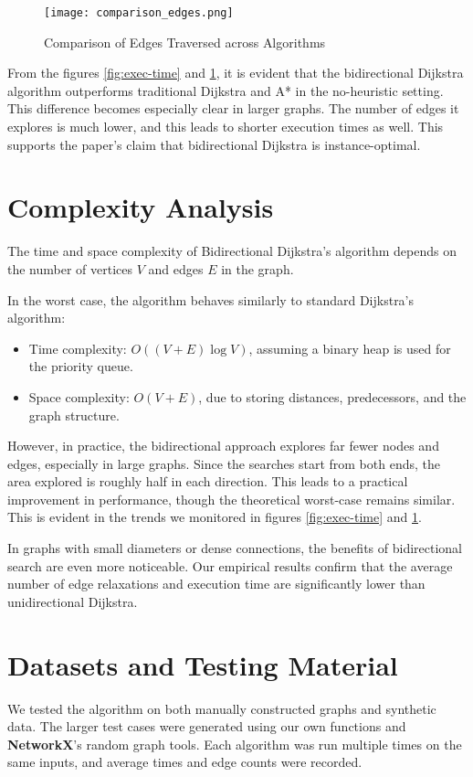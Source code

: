 \documentclass[12pt]{article}
\begin{document}
\begin{figure}[h]
    \centering
    \texttt{[image: comparison\_edges.png]}
    \caption{Comparison of Edges Traversed across Algorithms}
    \label{fig:edges-traversed}
\end{figure}

\break
From the figures \ref{fig:exec-time} and \ref{fig:edges-traversed}, it is evident that the bidirectional Dijkstra algorithm outperforms traditional Dijkstra and A* in the no-heuristic setting. This difference becomes especially clear in larger graphs. The number of edges it explores is much lower, and this leads to shorter execution times as well. This supports the paper’s claim that bidirectional Dijkstra is instance-optimal.

\section{Complexity Analysis}
The time and space complexity of Bidirectional Dijkstra’s algorithm depends on the number of vertices \( V \) and edges \( E \) in the graph.

In the worst case, the algorithm behaves similarly to standard Dijkstra's algorithm:
\begin{itemize}
    \item Time complexity: \( O((V + E) \log V) \), assuming a binary heap is used for the priority queue.
    \item Space complexity: \( O(V + E) \), due to storing distances, predecessors, and the graph structure.
\end{itemize}

However, in practice, the bidirectional approach explores far fewer nodes and edges, especially in large graphs. Since the searches start from both ends, the area explored is roughly half in each direction. This leads to a practical improvement in performance, though the theoretical worst-case remains similar. This is evident in the trends we monitored in figures \ref{fig:exec-time} and \ref{fig:edges-traversed}.

In graphs with small diameters or dense connections, the benefits of bidirectional search are even more noticeable. Our empirical results confirm that the average number of edge relaxations and execution time are significantly lower than unidirectional Dijkstra.

\section{Datasets and Testing Material}
We tested the algorithm on both manually constructed graphs and synthetic data. The larger test cases were generated using our own functions and \textbf{NetworkX}’s random graph tools. Each algorithm was run multiple times on the same inputs, and average times and edge counts were recorded.
\end{document}
